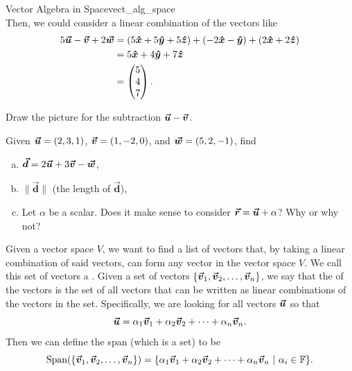 \begin{ex}{Vector Algebra in Space}{vect_alg_space}
\[            \]
            Then, we could consider a linear combination of the vectors like
            \begin{align*}
                5\boldsymbol{\boldsymbol{\vec{u}}} - \boldsymbol{\boldsymbol{\vec{v}}} + 2\boldsymbol{\boldsymbol{\vec{w}}} &= (5\boldsymbol{\hat{x}} + 5\boldsymbol{\hat{y}} + 5\boldsymbol{\hat{z}}) + (-2\boldsymbol{\hat{x}} -\boldsymbol{\hat{y}}) + (2\boldsymbol{\hat{x}} +2\boldsymbol{\hat{z}})\\
                &= 5\boldsymbol{\hat{x}} + 4\boldsymbol{\hat{y}} +7\boldsymbol{\hat{z}}\\
                &= \begin{pmatrix} 5 \\ 4 \\ 7 \end{pmatrix}.
            \end{align*}
        \end{ex}
        
        \begin{exercise}
            Draw the picture for the subtraction $\boldsymbol{\boldsymbol{\vec{u}}}-\boldsymbol{\boldsymbol{\vec{v}}}$.
        \end{exercise}
        
        \begin{exercise}
        Given $\boldsymbol{\boldsymbol{\vec{u}}}=(2,3,1)$, $\boldsymbol{\boldsymbol{\vec{v}}}=(1,-2,0)$, and $\boldsymbol{\boldsymbol{\vec{w}}}=(5,2,-1)$, find 
        \begin{enumerate}[(a)]
            \item $\boldsymbol{\vec{d}}=2\boldsymbol{\boldsymbol{\vec{u}}}+3\boldsymbol{\boldsymbol{\vec{v}}}-\boldsymbol{\boldsymbol{\vec{w}}}$,
            \item $\|\boldsymbol{\vec{d}}\|$ (the length of $\boldsymbol{\vec{d}}$),
            \item Let $\alpha$ be a scalar.  Does it make sense to consider $\boldsymbol{\vec{r}}=\boldsymbol{\boldsymbol{\vec{u}}}+\alpha$? Why or why not?
        \end{enumerate}
        \end{exercise}
        
        Given a vector space $V$, we want to find a list of vectors that, by taking a linear combination of said vectors, can form any vector in the vector space $V$.  We call this set of vectors a . Given a set of vectors $\{\boldsymbol{\boldsymbol{\vec{v}}}_1,\boldsymbol{\boldsymbol{\vec{v}}}_2,\dots,\boldsymbol{\boldsymbol{\vec{v}}}_n\}$, we say that the  of the vectors is the set of all vectors that can be written as linear combinations of the vectors in the set.  Specifically, we are looking for all vectors $\boldsymbol{\boldsymbol{\vec{u}}}$ so that
        \[
        \boldsymbol{\boldsymbol{\vec{u}}} = \alpha_1 \boldsymbol{\boldsymbol{\vec{v}}}_1 + \alpha_2 \boldsymbol{\boldsymbol{\vec{v}}}_2 +\cdots + \alpha_n \boldsymbol{\boldsymbol{\vec{v}}}_n.
        \]
        Then we can define the span (which is a set) to be
        \[
        \mathrm{Span}(\{\boldsymbol{\boldsymbol{\vec{v}}}_1,\boldsymbol{\boldsymbol{\vec{v}}}_2,\dots,\boldsymbol{\boldsymbol{\vec{v}}}_n\}) = \{\alpha_1 \boldsymbol{\boldsymbol{\vec{v}}}_1 + \alpha_2 \boldsymbol{\boldsymbol{\vec{v}}}_2 +\cdots + \alpha_n \boldsymbol{\boldsymbol{\vec{v}}}_n ~|~ \alpha_i \in \mathbb{F}\}.
        \]
        
